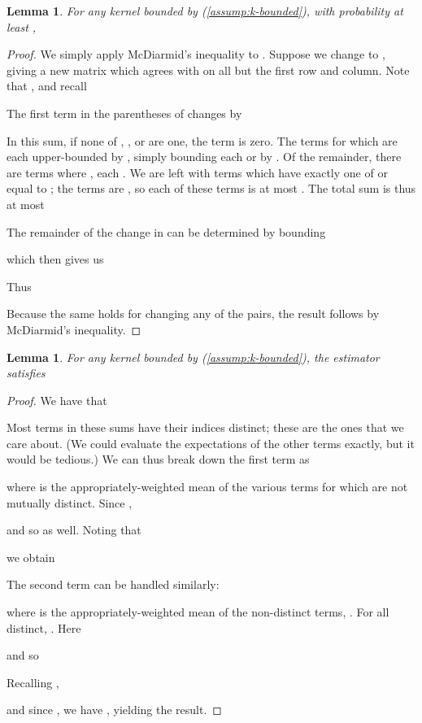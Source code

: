 \documentclass{article}
\newtheorem{lemma}[theorem]{Lemma} \crefname{lemma}{Lemma}{Lemmas}
\begin{document}
\begin{lemma} \label{thm:var-est-mcd}
For any kernel  bounded by  (\cref{assump:k-bounded}),
with probability at least ,

\end{lemma}
\begin{proof}
    We simply apply McDiarmid's inequality to .
    Suppose we change  to ,
    giving a new  matrix  which agrees with  on all but the first row and column.
    Note that ,
    and recall
    

    The first term in the parentheses of  changes by
    
    In this sum, if none of , , or  are one, the term is zero.
    The  terms for which  are each upper-bounded by ,
    simply bounding each  or  by .
    Of the remainder, there are  terms where ,
    each .
    We are left with  terms which have exactly one of  or  equal to ;
    the  terms are ,
    so each of these terms is at most .
    The total sum is thus at most
    

    The remainder of the change in  can be determined by bounding
    
    which then gives us
    
    Thus
    
    Because the same holds for changing any of the  pairs,
    the result follows by McDiarmid's inequality.
\end{proof}

\begin{lemma} \label{thm:var-est-bias}
For any kernel  bounded by  (\cref{assump:k-bounded}),
the estimator  satisfies

\end{lemma}
\begin{proof}
We have that


Most terms in these sums have their indices distinct;
these are the ones that we care about.
(We could evaluate the expectations of the other terms exactly, but it would be tedious.)
We can thus break down the first term as

where  is the appropriately-weighted mean of the various  terms for which  are not mutually distinct.
Since ,

and so  as well.
Noting that

we obtain


The second term can be handled similarly:

where  is the appropriately-weighted mean of the non-distinct terms,
.
For  all distinct,
.
Here

and so


Recalling ,

and since , we have , yielding the result.
\end{proof}
\end{document}
